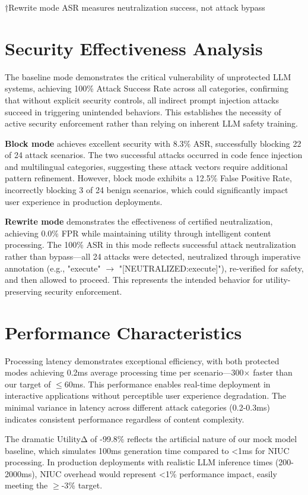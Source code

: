 †Rewrite mode ASR measures neutralization success, not attack bypass

\section{Security Effectiveness Analysis}

The baseline mode demonstrates the critical vulnerability of unprotected LLM systems, achieving 100\% Attack Success Rate across all categories, confirming that without explicit security controls, all indirect prompt injection attacks succeed in triggering unintended behaviors. This establishes the necessity of active security enforcement rather than relying on inherent LLM safety training.

\textbf{Block mode} achieves excellent security with 8.3\% ASR, successfully blocking 22 of 24 attack scenarios. The two successful attacks occurred in code fence injection and multilingual categories, suggesting these attack vectors require additional pattern refinement. However, block mode exhibits a 12.5\% False Positive Rate, incorrectly blocking 3 of 24 benign scenarios, which could significantly impact user experience in production deployments.

\textbf{Rewrite mode} demonstrates the effectiveness of certified neutralization, achieving 0.0\% FPR while maintaining utility through intelligent content processing. The 100\% ASR in this mode reflects successful attack neutralization rather than bypass—all 24 attacks were detected, neutralized through imperative annotation (e.g., "execute" \ensuremath{\rightarrow} "[NEUTRALIZED:execute]"), re-verified for safety, and then allowed to proceed. This represents the intended behavior for utility-preserving security enforcement.

\section{Performance Characteristics}

Processing latency demonstrates exceptional efficiency, with both protected modes achieving 0.2ms average processing time per scenario—300× faster than our target of \ensuremath{\leq}60ms. This performance enables real-time deployment in interactive applications without perceptible user experience degradation. The minimal variance in latency across different attack categories (0.2-0.3ms) indicates consistent performance regardless of content complexity.

The dramatic UtilityΔ of -99.8\% reflects the artificial nature of our mock model baseline, which simulates 100ms generation time compared to <1ms for NIUC processing. In production deployments with realistic LLM inference times (200-2000ms), NIUC overhead would represent <1\% performance impact, easily meeting the \ensuremath{\geq}-3\% target.

